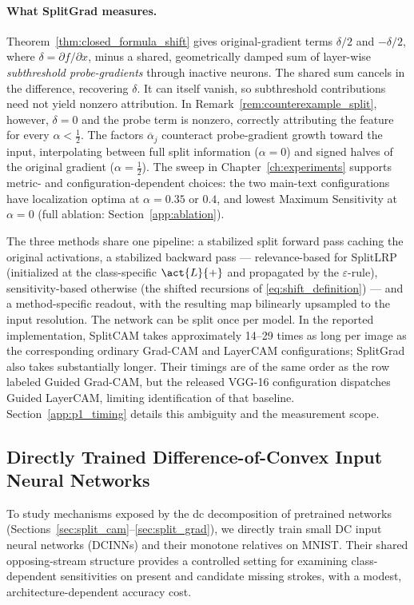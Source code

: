 \paragraph{What SplitGrad measures.}\label{subsec:closed_formulas}
Theorem~\ref{thm:closed_formula_shift} gives original-gradient terms $\delta/2$ and $-\delta/2$, where $\delta=\partial f/\partial x$, minus a shared, geometrically damped sum of layer-wise \emph{subthreshold probe-gradients} through inactive neurons. The shared sum cancels in the difference, recovering $\delta$. It can itself vanish, so subthreshold contributions need not yield nonzero attribution. In Remark~\ref{rem:counterexample_split}, however, $\delta=0$ and the probe term is nonzero, correctly attributing the feature for every $\alpha<\tfrac12$. The factors $\overline\alpha_j$ counteract probe-gradient growth toward the input, interpolating between full split information ($\alpha=0$) and signed halves of the original gradient ($\alpha=\tfrac12$). The sweep in Chapter~\ref{ch:experiments} supports metric- and configuration-dependent choices: the two main-text configurations have localization optima at $\alpha=0.35$ or $0.4$, and lowest Maximum Sensitivity at $\alpha=0$ (full ablation: Section~\ref{app:ablation}).

The three methods share one pipeline: a stabilized split forward pass caching the original activations, a stabilized backward pass --- relevance-based for SplitLRP (initialized at the class-specific $\act{L}{+}$ and propagated by the $\varepsilon$-rule), sensitivity-based otherwise (the shifted recursions of \eqref{eq:shift_definition}) --- and a method-specific readout, with the resulting map bilinearly upsampled to the input resolution. The network can be split once per model. In the reported implementation, SplitCAM takes approximately 14--29 times as long per image as the corresponding ordinary Grad-CAM and LayerCAM configurations; SplitGrad also takes substantially longer. Their timings are of the same order as the row labeled Guided Grad-CAM, but the released VGG-16 configuration dispatches Guided LayerCAM, limiting identification of that baseline. Section~\ref{app:p1_timing} details this ambiguity and the measurement scope.


\subsection{Directly Trained Difference-of-Convex Input Neural Networks}\label{sec:dcinns}

To study mechanisms exposed by the \ac{dc} decomposition of pretrained networks (Sections~\ref{sec:split_cam}--\ref{sec:split_grad}), we directly train small DC input neural networks (DCINNs) and their monotone relatives on MNIST. Their shared opposing-stream structure provides a controlled setting for examining class-dependent sensitivities on present and candidate missing strokes, with a modest, architecture-dependent accuracy cost.

